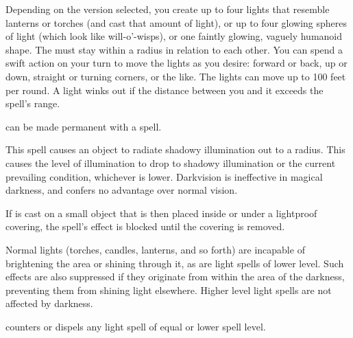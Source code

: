 \spellrng{\rngmed}
\begin{spelleffect}
  Depending on the version selected, you create up to four lights that resemble lanterns or torches (and cast that amount of light), or up to four glowing spheres of light (which look like will-o'-wisps), or one faintly glowing, vaguely humanoid shape. The  must stay within a \areasmall radius in relation to each other. You can spend a swift action on your turn to move the lights as you desire: forward or back, up or down, straight or turning corners, or the like. The lights can move up to 100 feet per round. A light winks out if the distance between you and it exceeds the spell's range.
\end{spelleffect}
\begin{spellnotes}
   can be made permanent with a  spell.
\end{spellnotes}

\spellrng{\rngtouch}
\begin{spelleffect}
  This spell causes an object to radiate shadowy illumination out to a \areamed radius. This causes the level of illumination to drop to shadowy illumination or the current prevailing condition, whichever is lower. Darkvision is ineffective in magical darkness, and confers no advantage over normal vision.
\end{spelleffect}
\begin{spellnotes}
  If  is cast on a small object that is then placed inside or under a lightproof covering, the spell's effect is blocked until the covering is removed.

  Normal lights (torches, candles, lanterns, and so forth) are incapable of brightening the area or shining through it, as are light spells of lower level. Such effects are also suppressed if they originate from within the area of the darkness, preventing them from shining light elsewhere. Higher level light spells are not affected by darkness.

  \par {} counters or dispels any light spell of equal or lower spell level.
\end{spellnotes}

